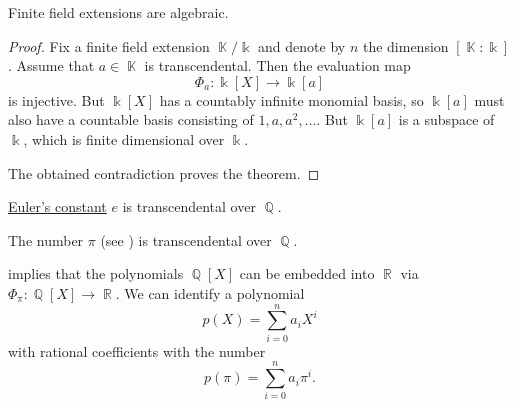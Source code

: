 \begin{proposition}\label{thm:finite_field_extensions_are_algebraic}
  Finite field extensions are algebraic.
\end{proposition}
\begin{proof}
  Fix a finite field extension \( \BbbK / \Bbbk \) and denote by \( n \) the dimension \( [\BbbK : \Bbbk] \). Assume that \( a \in \BbbK \) is transcendental. Then the evaluation map
  \begin{equation*}
    \Phi_a: \Bbbk[X] \to \Bbbk[a]
  \end{equation*}
  is injective. But \( \Bbbk[X] \) has a countably infinite monomial basis, so \( \Bbbk[a] \) must also have a countable basis consisting of \( 1, a, a^2, \ldots \). But \( \Bbbk[a] \) is a subspace of \( \Bbbk \), which is finite dimensional over \( \Bbbk \).

  The obtained contradiction proves the theorem.
\end{proof}

\begin{theorem}\label{thm:e_is_transcendental}\label{thm:eulers_constant_is_transcendental}
  \hyperref[def:exponential_function]{Euler's constant} \( e \) is transcendental over \( \BbbQ \).
\end{theorem}

\begin{theorem}\label{thm:pi_is_transcendental}
  The number \( \pi \) (see ) is transcendental over \( \BbbQ \).
\end{theorem}

\begin{example}\label{ex:polynomials_over_pi}
   implies that the polynomials \( \BbbQ[X] \) can be embedded into \( \BbbR \) via \( \Phi_\pi: \BbbQ[X] \to \BbbR \). We can identify a polynomial
  \begin{equation*}
    p(X) = \sum_{i=0}^n a_i X^i
  \end{equation*}
  with rational coefficients with the number
  \begin{equation*}
    p(\pi) = \sum_{i=0}^n a_i \pi^i.
  \end{equation*}
\end{example}


